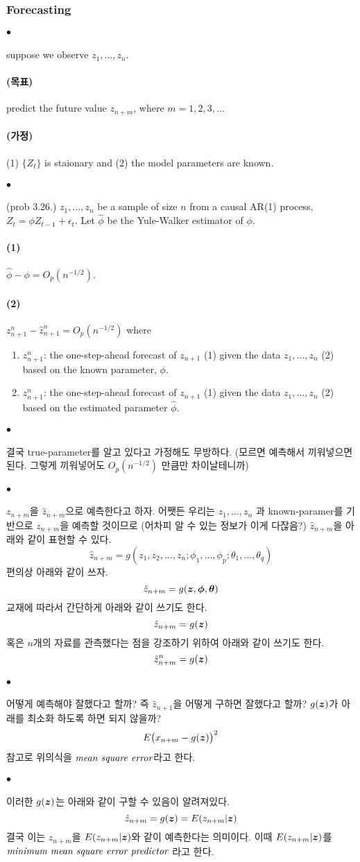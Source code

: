 \documentclass[12pt,oneside,english]{book}
\def\ck{\paragraph{\Large$\bullet$}\Large}
\def\goal{\paragraph{\Large(목표)}\Large}
\def\assume{\paragraph{\Large(가정)}\Large}
\def\one{\paragraph{\Large(1)}\Large}
\def\two{\paragraph{\Large(2)}\Large}
\newcommand{\bs}[1]{\mbox{\boldmath $#1$}}
\newcommand{\vz}{\mbox{\boldmath $z$}}
\begin{document}
\subsubsection{Forecasting}

\ck suppose we observe $z_1,\dots,z_n$. 

\goal predict the future value $z_{n+m}$, where $m=1,2,3,\dots$

\assume (1) $\{Z_t\}$ is staionary and (2) the model parameters are known. 

\ck (prob 3.26.) $z_1,\dots,z_n$ be a sample of size $n$ from a causal AR(1) process, $Z_t=\phi Z_{t-1}+\epsilon_t$. Let $\hat\phi$ be the Yule-Walker estimator of $\phi$. 
\one $\hat\phi-\phi=O_p(n^{-1/2})$.
\two $z_{n+1}^{n}-\hat{z}_{n+1}^{n}=O_p(n^{-1/2})$ where 
\begin{enumerate}[$\bullet$]
\item $z_{n+1}^{n}$: the one-step-ahead forecast of $z_{n+1}$ (1) given the data $z_1,\dots,z_n$ (2) based on the known parameter, $\phi$. 
\item $z_{n+1}^{n}$: the one-step-ahead forecast of $z_{n+1}$ (1) given the data $z_1,\dots,z_n$ (2) based on the estimated parameter $\hat\phi$. 
\end{enumerate} 

\ck 결국 true-parameter를 알고 있다고 가정해도 무방하다. (모르면 예측해서 끼워넣으면 된다. 그렇게 끼워넣어도 $O_p(n^{-1/2})$ 만큼만 차이날테니까) 

\ck $z_{n+m}$을 $\hat{z}_{n+m}$으로 예측한다고 하자. 어쨋든 우리는 $z_1,\dots,z_n$ 과 known-paramer를 기반으로 $z_{n+m}$을 예측할 것이므로 (어차피 알 수 있는 정보가 이게 다잖음?) $\hat{z}_{n+m}$을 아래와 같이 표현할 수 있다. 
\[
\hat{z}_{n+m}=g(z_1,z_2,\dots,z_n; \phi_1,\dots,\phi_p;\theta_1,\dots,\theta_q)
\]
편의상 아래와 같이 쓰자. 
\[
\hat{z}_{n+m}=g(\vz,\bs{\phi},\bs{\theta})
\]
교재에 따라서 간단하게 아래와 같이 쓰기도 한다. 
\[
\hat{z}_{n+m}=g(\vz)
\]
혹은 $n$개의 자료를 관측했다는 점을 강조하기 위하여 아래와 같이 쓰기도 한다. 
\[
\hat{z}^{n}_{n+m}=g(\vz)
\]

\ck 어떻게 예측해야 잘했다고 할까? 즉 $\hat{z}_{n+1}$을 어떻게 구하면 잘했다고 할까? $g(\vz)$가 아래를 최소화 하도록 하면 되지 않을까? 
\[
E\big(x_{n+m}-g(\vz)\big)^2
\]
참고로 위의식을 $\emph{mean square error}$라고 한다. 

\ck 이러한 $g(\vz)$는 아래와 같이 구할 수 있음이 알려져있다. 
\[
\hat{z}_{n+m}=g(\vz)=E(z_{n+m}|\vz)
\]
결국 이는 $z_{n+m}$을 $E(z_{n+m}|\vz)$와 같이 예측한다는 의미이다. 이때 $E(z_{n+m}|\vz)$를 $\emph{minimum mean square error predictor}$ 라고 한다. 
\end{document}
